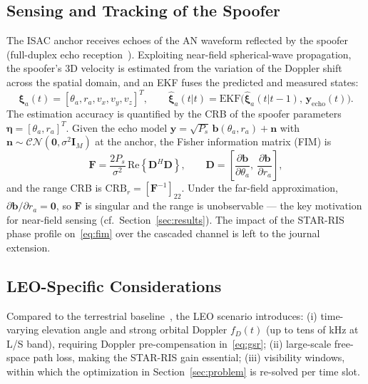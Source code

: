 \subsection{Sensing and Tracking of the Spoofer}\label{sec:sensing}
The ISAC anchor receives echoes of the AN waveform reflected by the spoofer (full-duplex echo reception~\cite{sabharwal2014fullduplex}). Exploiting near-field spherical-wave propagation, the spoofer's 3D velocity is estimated from the variation of the Doppler shift across the spatial domain, and an EKF fuses the predicted and measured states:
\begin{equation}\label{eq:ekf}
    \boldsymbol{\xi}_{a}(t) = [\theta_a, r_a, v_x, v_y, v_z]^T, \qquad \hat{\boldsymbol{\xi}}_{a}(t|t) = \mathrm{EKF}\big(\hat{\boldsymbol{\xi}}_{a}(t|t{-}1),\, \mathbf{y}_{\mathrm{echo}}(t)\big).
\end{equation}
The estimation accuracy is quantified by the CRB of the spoofer parameters $\boldsymbol{\eta} = [\theta_a, r_a]^T$. Given the echo model $\mathbf{y} = \sqrt{P_s}\,\mathbf{b}(\theta_a, r_a) + \mathbf{n}$ with $\mathbf{n} \sim \mathcal{CN}(\mathbf{0}, \sigma^2 \mathbf{I}_M)$ at the anchor, the Fisher information matrix (FIM) is
\begin{equation}\label{eq:fim}
    \mathbf{F} = \frac{2 P_s}{\sigma^2}\, \mathrm{Re}\!\left\{ \mathbf{D}^H \mathbf{D} \right\}, \qquad \mathbf{D} = \left[ \frac{\partial \mathbf{b}}{\partial \theta_a},\ \frac{\partial \mathbf{b}}{\partial r_a} \right],
\end{equation}
and the range CRB is $\mathrm{CRB}_r = [\mathbf{F}^{-1}]_{22}$. Under the far-field approximation, $\partial \mathbf{b}/\partial r_a = \mathbf{0}$, so $\mathbf{F}$ is singular and the range is unobservable --- the key motivation for near-field sensing (cf.\ Section~\ref{sec:results}). The impact of the STAR-RIS phase profile on~\eqref{eq:fim} over the cascaded channel is left to the journal extension.

\subsection{LEO-Specific Considerations}
Compared to the terrestrial baseline~\cite{zhao2025nearfield}, the LEO scenario introduces: (i) time-varying elevation angle and strong orbital Doppler $f_D(t)$ (up to tens of kHz at L/S band), requiring Doppler pre-compensation in~\eqref{eq:gsr}; (ii) large-scale free-space path loss, making the STAR-RIS gain essential; (iii) visibility windows, within which the optimization in Section~\ref{sec:problem} is re-solved per time slot.
